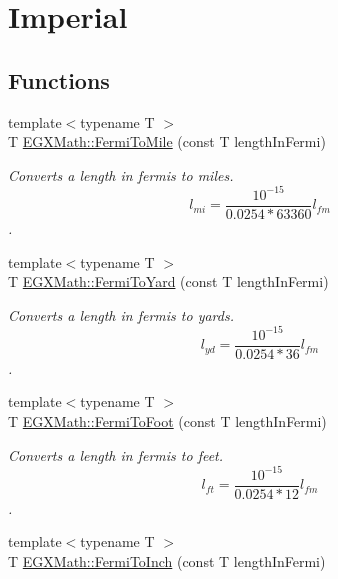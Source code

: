 \hypertarget{group___e_g_x_math-_conversions-_length_conversions-_non-_s_i-_fermi-_imperial}{}\section{Imperial}
\label{group___e_g_x_math-_conversions-_length_conversions-_non-_s_i-_fermi-_imperial}
\subsection*{Functions}
\begin{DoxyCompactItemize}
\item 
{\footnotesize template$<$typename T $>$ }\\T \mbox{\hyperlink{group___e_g_x_math-_conversions-_length_conversions-_non-_s_i-_fermi-_imperial_gaf74233f6bd05bd9a63a486813d3b4bf8}{E\+G\+X\+Math\+::\+Fermi\+To\+Mile}} (const T length\+In\+Fermi)
\begin{DoxyCompactList}\small\item\em Converts a length in fermis to miles. \[ l_{mi}=\frac{10^{-15}}{0.0254 * 63360} l_{fm} \]. \end{DoxyCompactList}\item 
{\footnotesize template$<$typename T $>$ }\\T \mbox{\hyperlink{group___e_g_x_math-_conversions-_length_conversions-_non-_s_i-_fermi-_imperial_ga5dce34089b9de102570c5c9c68b58176}{E\+G\+X\+Math\+::\+Fermi\+To\+Yard}} (const T length\+In\+Fermi)
\begin{DoxyCompactList}\small\item\em Converts a length in fermis to yards. \[ l_{yd}= \frac{10^{-15}}{0.0254 * 36} l_{fm} \]. \end{DoxyCompactList}\item 
{\footnotesize template$<$typename T $>$ }\\T \mbox{\hyperlink{group___e_g_x_math-_conversions-_length_conversions-_non-_s_i-_fermi-_imperial_ga22e9d7b13f45ef14c3963254caff7d78}{E\+G\+X\+Math\+::\+Fermi\+To\+Foot}} (const T length\+In\+Fermi)
\begin{DoxyCompactList}\small\item\em Converts a length in fermis to feet. \[ l_{ft}= \frac{10^{-15}}{0.0254 * 12} l_{fm} \]. \end{DoxyCompactList}\item 
{\footnotesize template$<$typename T $>$ }\\T \mbox{\hyperlink{group___e_g_x_math-_conversions-_length_conversions-_non-_s_i-_fermi-_imperial_gaacac85ebc839bc27889740d9ae608259}{E\+G\+X\+Math\+::\+Fermi\+To\+Inch}} (const T length\+In\+Fermi)

\end{DoxyCompactItemize}
